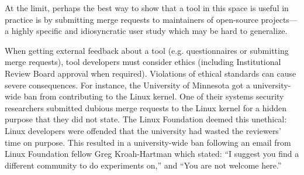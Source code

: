 At the limit, perhaps the
best way to show that a tool in this space is useful in practice is by
submitting merge requests to maintainers of open-source projects---a 
highly specific and idiosyncratic user study which may be hard to generalize.

When getting external feedback about a tool (e.g. questionnaires or
submitting merge requests), tool developers must consider ethics
(including Institutional Review Board approval when required). Violations of ethical
standards can cause severe consequences. For instance, the
University of Minnesota got a university-wide ban from contributing to
the Linux kernel. One of their systems security researchers submitted
dubious merge requests to the Linux kernel for a hidden purpose that they did
not state. The Linux Foundation deemed this
unethical: Linux developers were offended that the university had 
wasted the reviewers' time on purpose. This resulted in a university-wide ban
following an email from Linux Foundation fellow Greg Kroah-Hartman
which stated: ``I suggest you find a different community to do
experiments on,'' and ``You are not welcome
here.''~\cite{minnesota_banned}









